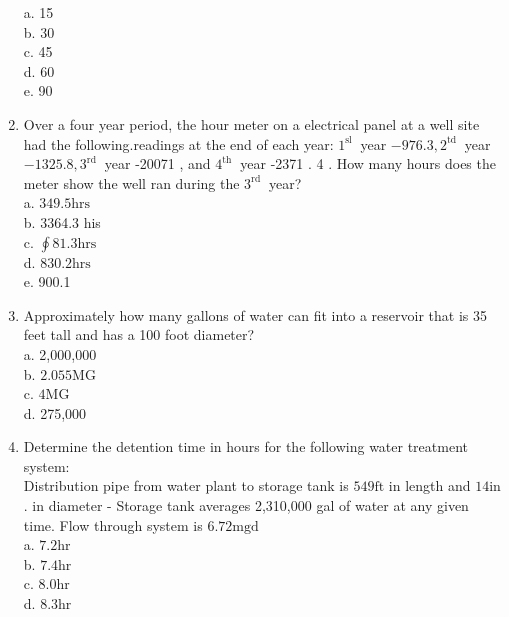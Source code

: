 \begin{enumerate}
a. 15\\
b. 30\\
c. 45\\
d. 60\\
e. 90\\
\item Over a four year period, the hour meter on a electrical panel at a well site had the following.readings at the end of each year: $1^{\text {sl }}$ year $-976.3,2^{\text {td }}$ year $-1325.8,3^{\text {rd }}$ year -20071 , and $4^{\text {th }}$ year -2371 . 4 . How many hours does the meter show the well ran during the $3^{\text {rd }}$ year?\\
a. $349.5 \mathrm{hrs}$\\
b. 3364.3 his\\
c. $\oint 81.3 \mathrm{hrs}$\\
d. $830.2 \mathrm{hrs}$\\
e. 900.1\\
\item Approximately how many gallons of water can fit into a reservoir that is 35 feet tall and has a 100 foot diameter?\\
a. 2,000,000\\
b. $2.055 \mathrm{MG}$\\
c. $4 \mathrm{MG}$\\
d. 275,000\\
\item Determine the detention time in hours for the following water treatment system:\\
Distribution pipe from water plant to storage tank is $549 \mathrm{ft}$ in length and $14 \mathrm{in}$. in diameter - Storage tank averages 2,310,000 gal of water at any given time.  Flow through system is $6.72 \mathrm{mgd}$\\
a. $7.2 \mathrm{hr}$\\
b. $7.4 \mathrm{hr}$\\
c. $8.0 \mathrm{hr}$\\
d. $8.3 \mathrm{hr}$\\


\end{enumerate}
